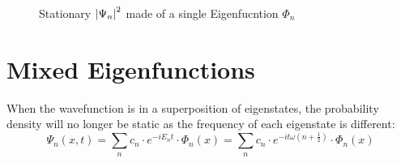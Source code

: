\documentclass{cis320}
\begin{document}
\begin{figure}[h]
    \centering
    \vspace{0.5cm}
    \caption{Stationary $\abs{\Psi_n}^2$ made of a single Eigenfucntion $\Phi_n$}
    \label{fig:images}
\end{figure}

\section{Mixed Eigenfunctions}
When the wavefunction is in a superposition of eigenstates, the probability density will no longer be static as the frequency of each eigenstate is different:
\[
\Psi_{n}(x,t) = \sum_{n} c_n \cdot e^{-iE_nt} \cdot \Phi_{n}(x) = \sum_{n} c_n \cdot e^{-it\omega(n+\frac{1}{2})} \cdot \Phi_{n}(x)
\]
\end{document}
